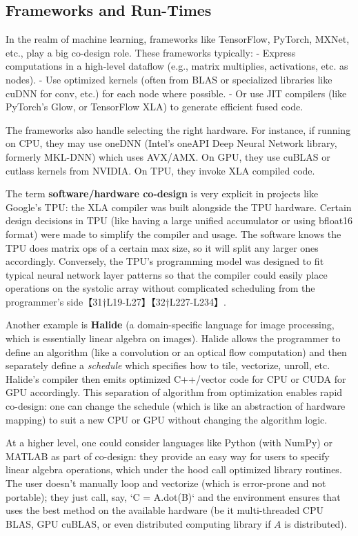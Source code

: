 \subsection{Frameworks and Run-Times}  
In the realm of machine learning, frameworks like TensorFlow, PyTorch, MXNet, etc., play a big co-design role. These frameworks typically:
- Express computations in a high-level dataflow (e.g., matrix multiplies, activations, etc. as nodes).
- Use optimized kernels (often from BLAS or specialized libraries like cuDNN for conv, etc.) for each node where possible.
- Or use JIT compilers (like PyTorch’s Glow, or TensorFlow XLA) to generate efficient fused code.

The frameworks also handle selecting the right hardware. For instance, if running on CPU, they may use oneDNN (Intel’s oneAPI Deep Neural Network library, formerly MKL-DNN) which uses AVX/AMX. On GPU, they use cuBLAS or cutlass kernels from NVIDIA. On TPU, they invoke XLA compiled code.

The term \textbf{software/hardware co-design} is very explicit in projects like Google’s TPU: the XLA compiler was built alongside the TPU hardware. Certain design decisions in TPU (like having a large unified accumulator or using bfloat16 format) were made to simplify the compiler and usage. The software knows the TPU does matrix ops of a certain max size, so it will split any larger ones accordingly. Conversely, the TPU’s programming model was designed to fit typical neural network layer patterns so that the compiler could easily place operations on the systolic array without complicated scheduling from the programmer’s side【31†L19-L27】【32†L227-L234】.

Another example is \textbf{Halide} (a domain-specific language for image processing, which is essentially linear algebra on images). Halide allows the programmer to define an algorithm (like a convolution or an optical flow computation) and then separately define a \textit{schedule} which specifies how to tile, vectorize, unroll, etc. Halide’s compiler then emits optimized C++/vector code for CPU or CUDA for GPU accordingly. This separation of algorithm from optimization enables rapid co-design: one can change the schedule (which is like an abstraction of hardware mapping) to suit a new CPU or GPU without changing the algorithm logic.

At a higher level, one could consider languages like Python (with NumPy) or MATLAB as part of co-design: they provide an easy way for users to specify linear algebra operations, which under the hood call optimized library routines. The user doesn’t manually loop and vectorize (which is error-prone and not portable); they just call, say, `C = A.dot(B)` and the environment ensures that uses the best method on the available hardware (be it multi-threaded CPU BLAS, GPU cuBLAS, or even distributed computing library if $A$ is distributed).

